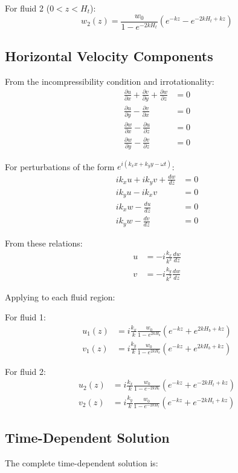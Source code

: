 \documentclass[12pt,a4paper]{article}
\begin{document}
For fluid 2 ($0 < z < H_t$):
\begin{equation}
w_2(z) = \frac{w_0}{1 - e^{-2kH_t}}(e^{-kz} - e^{-2kH_t+kz})
\end{equation}

\subsection{Horizontal Velocity Components}
From the incompressibility condition and irrotationality:
\begin{align}
\frac{\partial u}{\partial x} + \frac{\partial v}{\partial y} + \frac{\partial w}{\partial z} &= 0 \\
\frac{\partial u}{\partial y} - \frac{\partial v}{\partial x} &= 0 \\
\frac{\partial w}{\partial x} - \frac{\partial u}{\partial z} &= 0 \\
\frac{\partial w}{\partial y} - \frac{\partial v}{\partial z} &= 0
\end{align}

For perturbations of the form $e^{i(k_x x + k_y y - \omega t)}$:
\begin{align}
ik_xu + ik_yv + \frac{dw}{dz} &= 0 \\
ik_yu - ik_xv &= 0 \\
ik_xw - \frac{du}{dz} &= 0 \\
ik_yw - \frac{dv}{dz} &= 0
\end{align}

From these relations:
\begin{align}
u &= -i\frac{k_x}{k^2}\frac{dw}{dz} \\
v &= -i\frac{k_y}{k^2}\frac{dw}{dz}
\end{align}

Applying to each fluid region:

For fluid 1:
\begin{align}
u_1(z) &= i\frac{k_x}{k}\frac{w_0}{1 - e^{2kH_b}}(e^{-kz} + e^{2kH_b+kz}) \\
v_1(z) &= i\frac{k_y}{k}\frac{w_0}{1 - e^{2kH_b}}(e^{-kz} + e^{2kH_b+kz})
\end{align}

For fluid 2:
\begin{align}
u_2(z) &= i\frac{k_x}{k}\frac{w_0}{1 - e^{-2kH_t}}(e^{-kz} + e^{-2kH_t+kz}) \\
v_2(z) &= i\frac{k_y}{k}\frac{w_0}{1 - e^{-2kH_t}}(e^{-kz} + e^{-2kH_t+kz})
\end{align}

\subsection{Time-Dependent Solution}
The complete time-dependent solution is:
\end{document}
